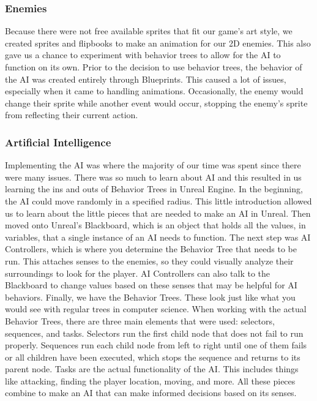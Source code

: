 \documentclass{sigchi}
\begin{document}
\subsubsection*{Enemies} Because there were not free available sprites that fit our game's art style, we created sprites and flipbooks to make an animation for our 2D enemies. This also gave us a chance to experiment with behavior trees to allow for the AI to function on its own. Prior to the decision to use behavior trees, the behavior of the AI was created entirely through Blueprints. This caused a lot of issues, especially when it came to handling animations. Occasionally, the enemy would change their sprite while another event would occur, stopping the enemy’s sprite from reflecting their current action. 

\subsubsection*{Artificial Intelligence} Implementing the AI was where the majority of our time was spent since there were many issues. There was so much to learn about AI and this resulted in us learning the ins and outs of Behavior Trees in Unreal Engine. In the beginning, the AI could move randomly in a specified radius. This little introduction allowed us to learn about the little pieces that are needed to make an AI in Unreal. Then moved onto Unreal's Blackboard, which is an object that holds all the values, in variables, that a single instance of an AI needs to function. The next step was AI Controllers, which is where you determine the Behavior Tree that needs to be run. This attaches senses to the enemies, so they could visually analyze their surroundings to look for the player. AI Controllers can also talk to the Blackboard to change values based on these senses that may be helpful for AI behaviors. Finally, we have the Behavior Trees. These look just like what you would see with regular trees in computer science. When working with the actual Behavior Trees, there are three main elements that were used: selectors, sequences, and tasks. Selectors run the first child node that does not fail to run properly. Sequences run each child node from left to right until one of them fails or all children have been executed, which stops the sequence and returns to its parent node. Tasks are the actual functionality of the AI. This includes things like attacking, finding the player location, moving, and more. All these pieces combine to make an AI that can make informed decisions based on its senses.
\end{document}
